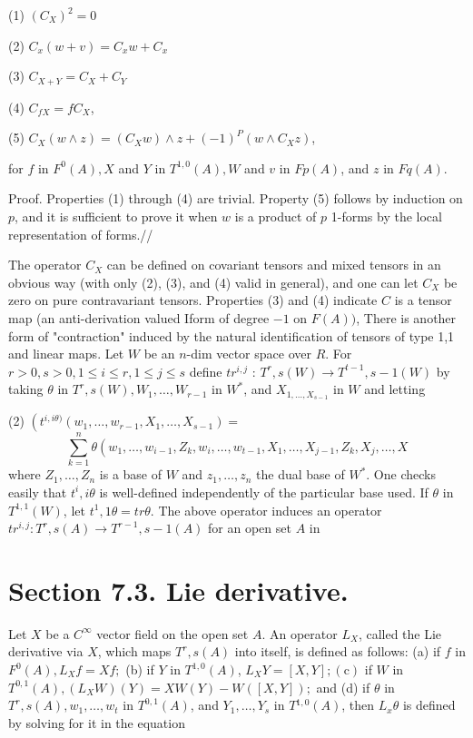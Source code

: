 \documentclass[10pt]{article}
\begin{document}
(1) $\left(C_{X}\right)^{2}=0$

(2) $C_{x}(w+v)=C_{x} w+C_{x}$

(3) $C_{X+Y}=C_{X}+C_{Y}$

(4) $C_{f X}=f C_{X}$,

(5) $C_{X}(w \wedge z)=\left(C_{X} w\right) \wedge z+(-1)^{P}\left(w \wedge C_{X} z\right)$,

for $f$ in $F^{0}(A), X$ and $Y$ in $T^{1,0}(A), W$ and $v$ in $F p(A)$, and $z$ in $F q(A)$.

Proof. Properties (1) through (4) are trivial. Property (5) follows by induction on $p$, and it is sufficient to prove it when $w$ is a product of $p$ 1-forms by the local representation of forms.//

The operator $C_{X}$ can be defined on covariant tensors and mixed tensors in an obvious way (with only (2), (3), and (4) valid in general), and one can let $C_{X}$ be zero on pure contravariant tensors. Properties (3) and (4) indicate $C$ is a tensor map (an anti-derivation valued Iform of degree $-1$ on $F(A))$, There is another form of "contraction" induced by the natural identification of tensors of type 1,1 and linear maps. Let $W$ be an $n$-dim vector space over $R$. For $r>0, s>0,1 \leq i \leq r, 1 \leq j \leq s$ define $t r^{i, j}$ : $T^{r}, s(W) \rightarrow T^{t-1}, s-1(W)$ by taking $\theta$ in $T^{r}, s(W), W_{1}, \ldots, W_{r-1}$ in $W^{*}$, and $X_{1, \ldots, X_{s-1}}$ in $W$ and letting

(2) $\left(t^{i, i \theta)}\left(w_{1}, \ldots, w_{r-1}, X_{1}, \ldots, X_{s-1}\right)=\right.$
$$
\sum_{k=1}^{n} \theta\left(w_{1}, \ldots, w_{i-1}, Z_{k}, w_{i}, \ldots, w_{t-1}, X_{1}, \ldots, X_{j-1}, Z_{k}, X_{j}, \ldots, X\right.
$$
where $Z_{1}, \ldots, Z_{n}$ is a base of $W$ and $z_{1}, \ldots, z_{n}$ the dual base of $W^{*}$. One checks easily that $t^{i}, i \theta$ is well-defined independently of the particular base used. If $\theta$ in $T^{1,1}(W)$, let $t^{1}, 1 \theta=t r \theta$. The above operator induces an operator $t r^{i, j}: T^{r}, s(A) \rightarrow T^{r-1}, s-1(A)$ for an open set $A$ in

\section{Section 7.3. Lie derivative.}
Let $X$ be a $C^{\infty}$ vector field on the open set $A .$ An operator $L_{X}$, called the Lie derivative via $X$, which maps $T^{r}, s(A)$ into itself, is defined as follows: (a) if $f$ in $F^{0}(A), L_{X} f=X f ;$ (b) if $Y$ in $T^{1,0}(A)$, $L_{X} Y=[X, Y] ;(\mathrm{c})$ if $W$ in $T^{0,1}(A),\left(L_{X} W\right)(Y)=X W(Y)-W([X, Y]) ;$ and (d) if $\theta$ in $T^{r}, s(A), w_{1}, \ldots, w_{t}$ in $T^{0,1}(A)$, and $Y_{1}, \ldots, Y_{s}$ in $T{ }^{1,0}(A)$, then $L_{x} \theta$ is defined by solving for it in the equation
\end{document}
